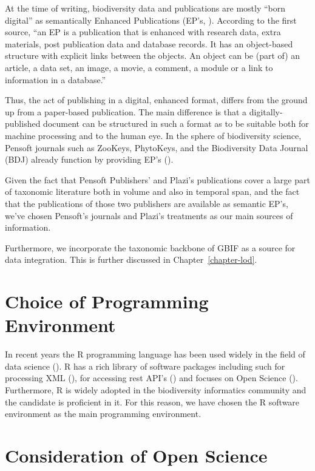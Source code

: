 At the time of writing, biodiversity data and publications are mostly ``born digital'' as semantically Enhanced Publications (EP's, \cite{claerbout_electronic_1992,godtsenhoven_van_emerging_2009,shotton_semantic_2009}). According to the first source, ``an EP is a publication that is enhanced with research data, extra materials, post publication data and database records. It has an object-based structure with explicit links between the objects. An object can be (part of) an article, a data set, an image, a movie, a comment, a module or a link to information in a database.''

Thus, the act of publishing in a digital, enhanced format, differs from the ground up from a paper-based publication. The main difference is that a digitally-published document can be structured in such a format as to be suitable both for machine processing and to the human eye. In the sphere of biodiversity science, Pensoft journals such as ZooKeys, PhytoKeys, and the Biodiversity Data Journal (BDJ) already function by providing EP's (\cite{penev_semantic_2010}).

Given the fact that Pensoft Publishers' and Plazi's publications cover a large part of taxonomic literature both in volume and also in temporal span, and the fact that the publications of those two publishers are available as semantic EP's, we've chosen Pensoft's journals and Plazi's treatments as our main sources of information.

Furthermore, we incorporate the taxonomic backbone of GBIF \cite{gbif_secretariat_gbif_2017} as a source for data integration. This is further discussed in Chapter~\ref{chapter-lod}.

\section{Choice of Programming Environment}

In recent years the R programming language has been used widely in the field of data science (\cite{r_core_team_r:_2016}). R has a rich library of software packages including such for processing XML (\cite{wickham_xml2:_2018}), for accessing rest API's (\cite{wickham_httr:_2017}) and focuses on Open Science (). Furthermore, R is widely adopted in the biodiversity informatics community and the candidate is proficient in it. For this reason, we have chosen the R software environment as the main programming environment.

\section{Consideration of Open Science}

